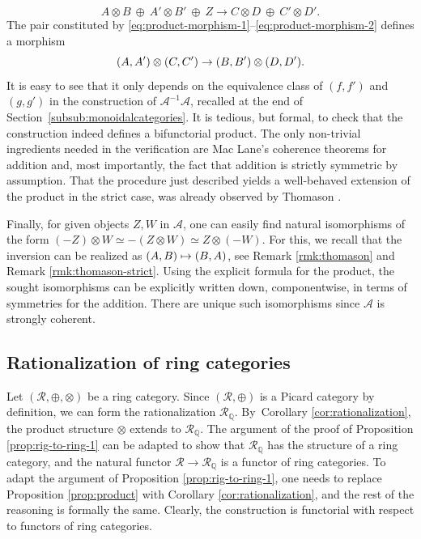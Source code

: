 \documentclass[JEP,XML,SOM,Unicode,published]{cedram}
\newcommand\mto{\mathchoice{\longmapsto}{\mapsto}{\mapsto}{\mapsto}}
\theoremstyle{plain}
\theoremstyle{definition}
\newcommand{\QBbb}{\mathbb Q}
\newcommand{\Acal}{\mathcal A}
\newcommand{\Rcal}{\mathcal R}
\begin{document}
\begin{equation}\label{eq:product-morphism-2}
A\otimes B\ \oplus\ A'\otimes B'\ \oplus\ Z\to C\otimes D\ \oplus\ C'\otimes D'.
\end{equation}
The pair constituted by \eqref{eq:product-morphism-1}--\eqref{eq:product-morphism-2} defines a morphism\vspace*{-3pt}
\[
(A,A')\otimes (C,C')\to (B,B')\otimes\nobreak (D,D').
\]
It is easy to see that it only depends on the equivalence class of $(f,f')$ and $(g,g')$ in the construction of $\Acal^{-1}\Acal$, recalled at the end of Section~\ref{subsub:monoidalcategories}. It is tedious, but formal, to check that the construction indeed defines a bifunctorial product. The only non-trivial ingredients needed in the verification are Mac Lane's coherence theorems for addition and, most importantly, the fact that addition is strictly symmetric by assumption. That the procedure just described yields a well-behaved extension of the product in the strict case, was already observed by Thomason \cite[p.\,572]{ThomasonPhony}.

Finally, for given objects $Z, W$ in $\Acal$, one can easily find natural isomorphisms of the form $(-Z)\otimes W\simeq -(Z\otimes W)\simeq Z\otimes (-W)$. For this, we recall that the inversion can be realized as $(A,B)\mto (B,A)$, see Remark \ref{rmk:thomason} and Remark \ref{rmk:thomason-strict}. Using the explicit formula for the product, the sought isomorphisms can be explicitly written down, componentwise, in terms of symmetries for the addition. There are unique such isomorphisms since $\Acal$ is strongly coherent.\enlargethispage{.5\baselineskip}%

\subsection{Rationalization of ring categories}\label{subsec:rationalization-ring-categories}
Let $(\Rcal,\oplus,\otimes)$ be a ring category. Since $(\Rcal,\oplus)$ is a Picard category by definition, we can form the rationalization $\Rcal_{\QBbb}$. By~Corollary \ref{cor:rationalization}, the product structure $\otimes$ extends to $\Rcal_{\QBbb}$. The argument of the proof of Proposition \ref{prop:rig-to-ring-1} can be adapted to show that $\Rcal_{\QBbb}$ has the structure of a ring category, and the natural functor $\Rcal\to\Rcal_{\QBbb}$ is a functor of ring categories. To adapt the argument of Proposition \ref{prop:rig-to-ring-1}, one needs to replace Proposition \ref{prop:product} with Corollary \ref{cor:rationalization}, and the rest of the reasoning is formally the same. Clearly, the construction is functorial with respect to functors of ring categories.
\end{document}
